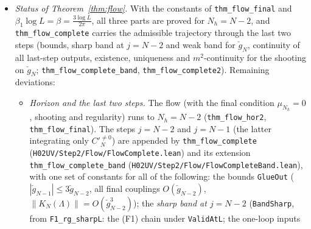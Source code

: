 \documentclass[11pt]{amsart}
\theoremstyle{definition}
\theoremstyle{remark}
\numberwithin{equation}{section}
\begin{document}
\begin{itemize}
  $\check g_{N_h}$ (\texttt{traj\_strict\_mono\_z}; the $\mu$-cone carries $\|\delta\zeta_k\|\le s|\delta\mu_k|$ with
  $s$ of order one, the $\check g$-cone $\|\delta\zeta_k\|\le z_2\delta\check g_k$). The fixed-$\beta_R$ arguments are
  stated generically with the signed cone and the monotonicity as hypotheses (\texttt{H02UV/Flow2/FixedRParamG*.lean}).
  The (F1) mass term uses $|\zeta_j|\le c_\zeta\check g_j$, $c_\zeta=O(L^2)$, so $K_e=O(L^2)$.
  The horizon enters only through the hypothesis bundles (\texttt{FinConstZ}, \texttt{FinHypZ},
  \texttt{flow\_finalZ\_hyp}); \texttt{flow\_finalZ\_of} derives all conclusions on any set of masses where the
  bundles hold. Remaining deviations (see the status item below): $m^2=0$ is not covered;
  differentiability is in $b$ only; at $\beta_R=1/\epsilon$ (the right end of $U$) only existence and uniqueness are
  proved; the $\zeta_j$ bounds are not part of the statement; the constants include the extra conditions of
  differentiability ($4\ell^2(L^2c_\mu+c_m)\epsilon\le\frac18$), of $m^2$-continuity (the radius $\rho$) and of the
  $\zeta$-channel.
\item \emph{Status of Theorem~\ref{thm:flow}.} With the constants of \texttt{thm\_flow\_final} and
  $\beta_1\log L=\beta=\frac{3\log L}{2\pi}$, all three parts are proved for $N_h=N-2$, and
  \texttt{thm\_flow\_complete} carries the admissible trajectory through the last
  two steps (bounds, sharp band at $j=N-2$ and weak band for $\check g_N$, continuity of all last-step outputs,
  existence, uniqueness and $m^2$-continuity for the shooting on $\check g_N$; \texttt{thm\_flow\_complete\_band},
  \texttt{thm\_flow\_complete2}). Remaining deviations:
  \begin{itemize}
  \item \emph{Horizon and the last two steps.} The flow (with the final condition $\mu_{N_h}=0$, shooting
    and regularity) runs to $N_h=N-2$ (\texttt{thm\_flow\_hor2}, \texttt{thm\_flow\_final}). The steps $j=N-2$ and
    $j=N-1$ (the latter integrating only $C'^{\ne0}_N$) are appended by \texttt{thm\_flow\_complete}
    (\texttt{H02UV/Step2/Flow/FlowComplete.lean}) and its extension \texttt{thm\_flow\_complete\_band}
    (\texttt{H02UV/Step2/Flow/FlowCompleteBand.lean}), with one set of constants for all of the following:
    the bounds \texttt{GlueOut} ($|\check g_{N-1}|\le3\check g_{N-2}$, all final couplings
    $O(\check g_{N-2})$, $\|K_N(\Lambda)\|=O(\check g_{N-2}^3)$); the \emph{sharp band at $j=N-2$}
    (\texttt{BandSharp}, from \texttt{F1\_rg\_sharpL}: the (F1) chain under \texttt{ValidAtL}; the one-loop inputs

\end{itemize}
\end{itemize}
\end{document}
